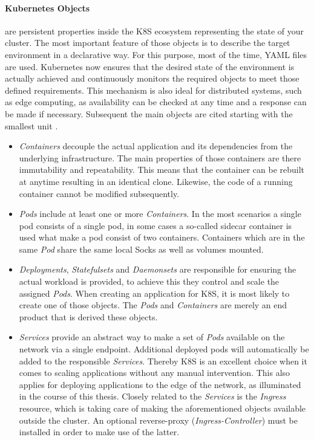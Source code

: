 \documentclass[MSC,Master,english]{twbook}%
\begin{document}
\paragraph{Kubernetes Objects} are persistent properties inside the \ac{K8S} ecosystem representing the state of your cluster. The most important feature of those objects is to describe the target environment in a declarative way. For this purpose, most of the time, YAML files are used. Kubernetes now ensures that the desired state of the environment is actually achieved and continuously monitors the required objects to meet those defined requirements. This mechanism is also ideal for distributed systems, such as edge computing, as availability can be checked at any time and a response can be made if necessary. Subsequent the main objects are cited starting with the smallest unit \cite{k8sconc}.
\begin{itemize}
    \item \textit{Containers} decouple the actual application and its dependencies from the underlying infrastructure. The main properties of those containers are there immutability and repeatability. This means that the container can be rebuilt at anytime resulting in an identical clone. Likewise, the code of a running container cannot be modified subsequently.
    \item \textit{Pods} include at least one or more \textit{Containers}. In the most scenarios a single pod consists of a single pod, in some cases a so-called sidecar container is used what make a pod consist of two containers. Containers which are in the same \textit{Pod} share the same local Socks as well as volumes mounted.
    \item \textit{Deployments}, \textit{Statefulsets} and \textit{Daemonsets} are responsible for ensuring the actual workload is provided, to achieve this they control and scale the assigned \textit{Pods}. When creating an application for \ac{K8S}, it is most likely to create one of those objects. The \textit{Pods} and \textit{Containers} are merely an end product that is derived these objects.
    \item \textit{Services} provide an abstract way to make a set of \textit{Pods} available on the network via a single endpoint. Additional deployed pods will automatically be added to the responsible \textit{Services}. Thereby \ac{K8S} is an excellent choice when it comes to scaling applications without any manual intervention. This also applies for deploying applications to the edge of the network, as illuminated in the course of this thesis. Closely related to the \textit{Services} is the \textit{Ingress} resource, which is taking care of making the aforementioned objects available outside the cluster. An optional reverse-proxy (\textit{Ingress-Controller}) must be installed in order to make use of the latter. \newline

\end{itemize}
\end{document}
